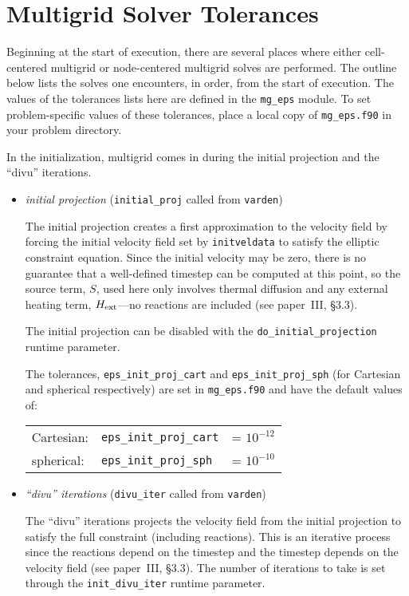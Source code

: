 \section{Multigrid Solver Tolerances}

Beginning at the start of execution, there are several places where
either cell-centered multigrid or node-centered multigrid solves are
performed.  The outline below lists the solves one encounters, in order,
from the start of execution.  The values of the tolerances lists here
are defined in the {\tt mg\_eps} module.  To set problem-specific values
of these tolerances, place a local copy of {\tt mg\_eps.f90} in your
problem directory.

In the initialization, multigrid comes in during the initial projection
and the ``divu'' iterations.

\begin{itemize}

\item {\em initial projection} ({\tt initial\_proj} called from {\tt varden})

  The initial projection creates a first approximation to the velocity
  field by forcing the initial velocity field set by {\tt initveldata}
  to satisfy the elliptic constraint equation.  Since the initial
  velocity may be zero, there is no guarantee that a well-defined
  timestep can be computed at this point, so the source term, $S$,
  used here only involves thermal diffusion and any external heating
  term, ${H_{\rm ext}}$---no reactions are included (see paper~III, \S 3.3).

  The initial projection can be disabled with the {\tt do\_initial\_projection}
  runtime parameter.

  The tolerances, {\tt eps\_init\_proj\_cart} and {\tt eps\_init\_proj\_sph}
  (for Cartesian and spherical respectively) are set in {\tt mg\_eps.f90}
  and have the default values of:
   \begin{center}
   \begin{tabular}{lll}
   Cartesian:   &  {\tt eps\_init\_proj\_cart} &= $10^{-12}$ \\
   spherical:   &  {\tt eps\_init\_proj\_sph}  &= $10^{-10}$
   \end{tabular}
   \end{center}


\item {\em ``divu'' iterations} ({\tt divu\_iter} called from {\tt varden})

  The ``divu'' iterations projects the velocity field from the initial
  projection to satisfy the full constraint (including reactions).
  This is an iterative process since the reactions depend on the
  timestep and the timestep depends on the velocity field (see
  paper~III, \S 3.3).  The number of iterations to take is set through
  the {\tt init\_divu\_iter} runtime parameter.


\end{itemize}
